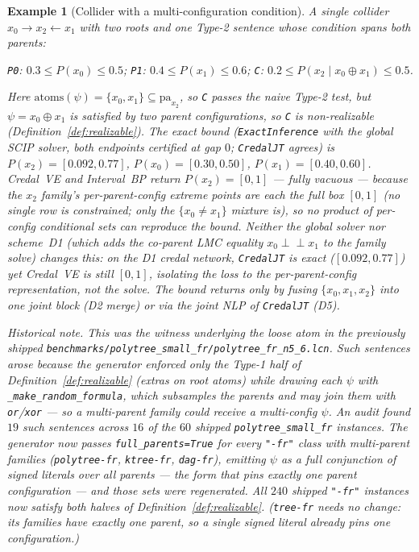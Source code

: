 \documentclass[11pt]{article}
\newtheorem{example}{Example}
\newcommand{\indep}{\perp\!\!\!\perp}
\newcommand{\pa}{\mathrm{pa}}
\newcommand{\atoms}{\mathrm{atoms}}
\begin{document}
\begin{example}[Collider with a multi-configuration condition]\label{ex:collider}
A single collider $x_0\to x_2\leftarrow x_1$ with two roots and one Type-2 sentence whose condition
spans both parents:
\begin{center}\small
\texttt{P0}: $0.3\le P(x_0)\le0.5$;\quad
\texttt{P1}: $0.4\le P(x_1)\le0.6$;\quad
\texttt{C}: $0.2\le P(x_2\mid x_0\oplus x_1)\le0.5$.
\end{center}
Here $\atoms(\psi)=\{x_0,x_1\}\subseteq\pa_{x_2}$, so \texttt{C} passes the naive Type-2 test, but
$\psi=x_0\oplus x_1$ is satisfied by \emph{two} parent configurations, so \texttt{C} is non-realizable
(Definition~\ref{def:realizable}). The exact bound (\texttt{ExactInference} with the global SCIP
solver, both endpoints certified at gap $0$; \texttt{CredalJT} agrees) is
$P(x_2)=[0.092,0.77]$, $P(x_0)=[0.30,0.50]$, $P(x_1)=[0.40,0.60]$. Credal~VE and Interval~BP return
$P(x_2)=[0,1]$ --- fully vacuous --- because the $x_2$ family's per-parent-config extreme points are
each the full box $[0,1]$ (no single row is constrained; only the $\{x_0\!\neq\!x_1\}$ mixture is), so
no product of per-config conditional sets can reproduce the bound. \emph{Neither} the global solver
\emph{nor} scheme~D1 (which adds the co-parent LMC equality $x_0\indep x_1$ to the family solve)
changes this: on the D1 credal network, \texttt{CredalJT} is exact ($[0.092,0.77]$) yet Credal~VE is
still $[0,1]$, isolating the loss to the per-parent-config \emph{representation}, not the solve. The
bound returns only by fusing $\{x_0,x_1,x_2\}$ into one joint block (D2 merge) or via the joint NLP of
\texttt{CredalJT} (D5).

\emph{Historical note.} This was the witness underlying the loose atom in the previously shipped
\texttt{benchmarks/polytree\_small\_fr/polytree\_fr\_n5\_6.lcn}. Such sentences arose because the
generator enforced only the Type-1 half of Definition~\ref{def:realizable} (extras on root atoms) while
drawing each $\psi$ with \texttt{\_make\_random\_formula}, which subsamples the parents and may join
them with \texttt{or}/\texttt{xor} --- so a multi-parent family could receive a multi-config $\psi$. An
audit found $19$ such sentences across $16$ of the $60$ shipped \texttt{polytree\_small\_fr} instances.
The generator now passes \texttt{full\_parents=True} for every \texttt{"-fr"} class with multi-parent
families (\texttt{polytree-fr}, \texttt{ktree-fr}, \texttt{dag-fr}), emitting $\psi$ as a full
conjunction of signed literals over \emph{all} parents --- the form that pins exactly one parent
configuration --- and those sets were regenerated. All $240$ shipped \texttt{"-fr"} instances now
satisfy both halves of Definition~\ref{def:realizable}. (\texttt{tree-fr} needs no change: its families
have exactly one parent, so a single signed literal already pins one configuration.)
\end{example}
\end{document}
